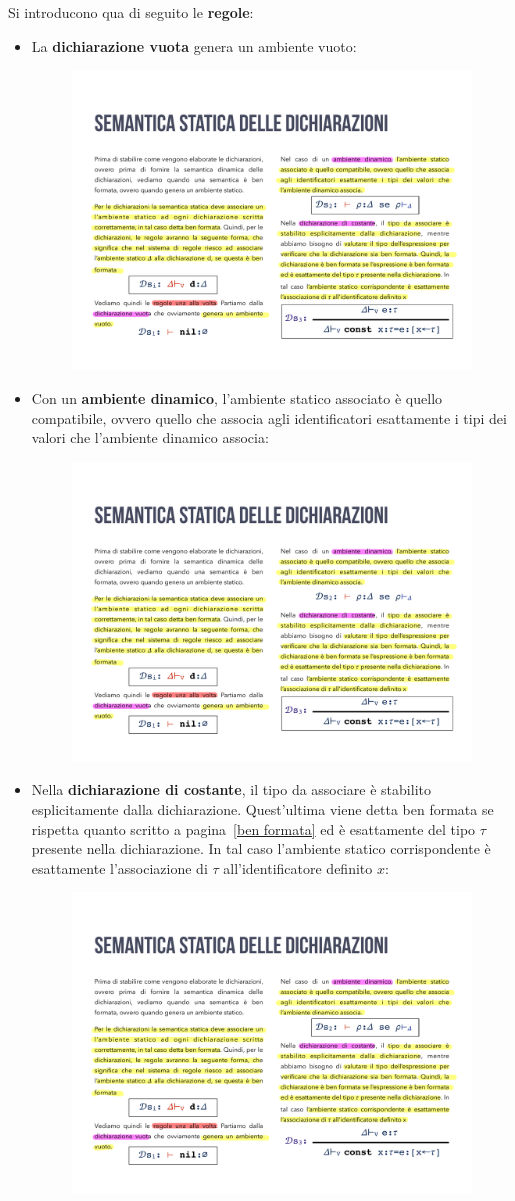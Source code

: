 \documentclass[a4paper]{article}
\begin{document}
	\noindent
	Si introducono qua di seguito le \textbf{regole}:
	\begin{itemize}
		\item La \textbf{dichiarazione vuota} genera un ambiente vuoto:
		\begin{figure}[!htp]
			\centering
			\includegraphics[width=.3\textwidth]{img/semantica_statica_dichiarazioni-1.pdf}
		\end{figure}
		
		\item Con un \textbf{ambiente dinamico}, l'ambiente statico associato è quello compatibile, ovvero quello che associa agli identificatori esattamente i tipi dei valori che l'ambiente dinamico associa:
		\begin{figure}[!htp]
			\centering
			\includegraphics[width=.4\textwidth]{img/semantica_statica_dichiarazioni-2.pdf}
		\end{figure}
		
		\item Nella \textbf{dichiarazione di costante}, il tipo da associare è stabilito esplicitamente dalla dichiarazione. Quest'ultima viene detta ben formata se rispetta quanto scritto a pagina~\ref{ben formata} ed è esattamente del tipo $\tau$ presente nella dichiarazione. In tal caso l'ambiente statico corrispondente è esattamente l'associazione di $\tau$ all'identificatore definito $x$:
		\begin{figure}[!htp]
			\centering
			\includegraphics[width=.5\textwidth]{img/semantica_statica_dichiarazioni-3.pdf}
		\end{figure}
	\end{itemize}\newpage
\end{document}
